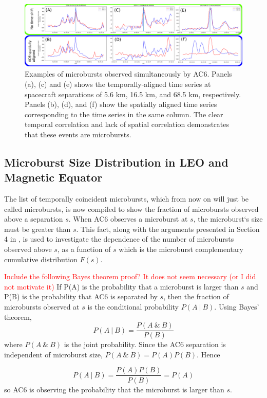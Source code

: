 \documentclass[draft]{agujournal2019}
\begin{document}
\begin{figure}
\includegraphics[width=\textwidth]{fig2.png}
\caption{Examples of microbursts observed simultaneously by AC6. Panels (a), (c) and (e) shows the temporally-aligned time series at spacecraft separations of 5.6 km, 16.5 km, and 68.5 km, respectively. Panels (b), (d), and (f) show the spatially aligned time series corresponding to the time series in the same column. The clear temporal correlation and lack of spatial correlation demonstrates that these events are microbursts.} 
\label{fig2}
\end{figure}
	

\subsection{Microburst Size Distribution in LEO and Magnetic Equator}\label{microburst_distribution}
The list of temporally coincident microbursts, which from now on will just be called microbursts, is now compiled to show the fraction of microbursts observed above a separation $s$. When AC6 observes a microburst at $s$, the microburst`s size must be greater than $s$. This fact, along with the arguments presented in Section 4 in , is used to investigate the dependence of the number of microbursts observed above $s$, as a function of $s$ which is the microburst complementary cumulative distribution $F(s)$. 

\textcolor{red}{Include the following Bayes theorem proof? It does not seem necessary (or I did not motivate it)} If P(A) is the probability that a microburst is larger than $s$ and P(B) is the probability that AC6 is separated by $s$, then the fraction of microbursts observed at $s$ is the conditional probability $P(A \ \vert \ B)$. Using Bayes’ theorem, 
\begin{equation}
P(A \ \vert \ B) = \frac{P(A \ \& \ B)}{P(B)}
\end{equation} where $P(A \ \& \ B)$ is the joint probability. Since the AC6 separation is independent of microburst size, $P(A \ \& \ B) = P(A)P(B)$. Hence

\begin{equation}
P(A \ \vert \ B) = \frac{P(A)P(B)}{P(B)} = P(A)
\end{equation} so AC6 is observing the probability that the microburst is larger than $s$.
\end{document}
